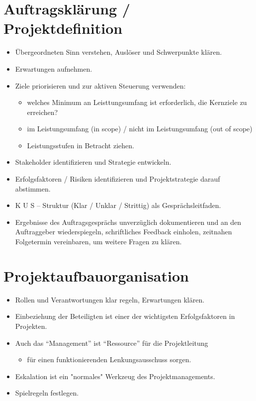 \documentclass[a4paper]{article}
\begin{document}
\section{Auftragsklärung / Projektdefinition}
\begin{itemize}
  \item Übergeordneten Sinn verstehen, Auslöser und Schwerpunkte klären.
  \item Erwartungen aufnehmen.
  \item Ziele priorisieren und zur aktiven Steuerung verwenden:
    \begin{itemize}
      \item welches Minimum an Leisttungsumfang ist erforderlich, die Kernziele zu erreichen?
      \item im Leistungsumfang (in scope) / nicht im Leistungsumfang (out of scope)
      \item Leistungsstufen in Betracht ziehen.
    \end{itemize}
  \item Stakeholder identifizieren und Strategie entwickeln.
  \item Erfolgsfaktoren / Risiken identifizieren und Projektstrategie darauf abstimmen.
  \item K U S -- Struktur (Klar / Unklar / Strittig) als Gesprächsleitfaden.
  \item Ergebnisse des Auftragsgesprächs unverzüglich dokumentieren und an den Auftraggeber wiederspiegeln, schriftliches Feedback einholen, zeitnahen Folgetermin vereinbaren, um weitere Fragen zu klären.
\end{itemize}

\section{Projektaufbauorganisation}
\begin{itemize}
  \item Rollen und Verantwortungen klar regeln, Erwartungen klären.
  \item Einbeziehung der Beteiligten ist einer der wichtigsten Erfolgsfaktoren in Projekten.
  \item Auch das ``Management'' ist ``Ressource'' für die Projektleitung
  \begin{itemize}
    \item für einen funktionierenden Lenkungsausschuss sorgen.
  \end{itemize}
  \item Eskalation ist ein "normales" Werkzeug des Projektmanagements.
  \item Spielregeln festlegen.
\end{itemize}
\end{document}
